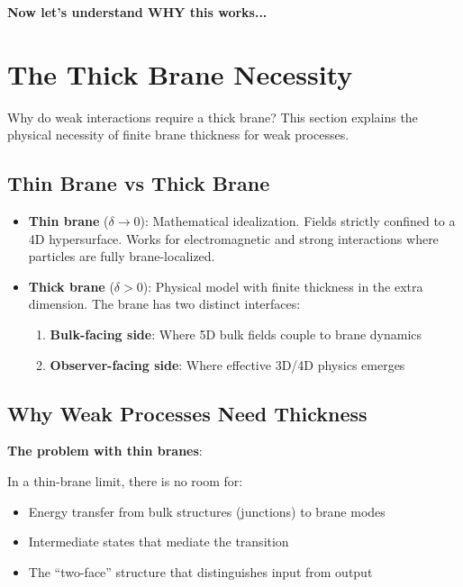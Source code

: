 \textbf{Now let's understand WHY this works...}

\section{The Thick Brane Necessity}
\label{sec:thick_brane}

Why do weak interactions require a thick brane? This section explains the physical
necessity of finite brane thickness for weak processes.

\subsection{Thin Brane vs Thick Brane}

\begin{itemize}[nosep]
\item \textbf{Thin brane} ($\delta \to 0$): Mathematical idealization. Fields strictly
      confined to a 4D hypersurface. Works for electromagnetic and strong interactions
      where particles are fully brane-localized.

\item \textbf{Thick brane} ($\delta > 0$): Physical model with finite thickness
      in the extra dimension. The brane has two distinct interfaces:
      \begin{enumerate}[nosep]
      \item \textbf{Bulk-facing side}: Where 5D bulk fields couple to brane dynamics
      \item \textbf{Observer-facing side}: Where effective 3D/4D physics emerges
      \end{enumerate}
\end{itemize}

\subsection{Why Weak Processes Need Thickness}

\textbf{The problem with thin branes}:

In a thin-brane limit, there is no room for:
\begin{itemize}[nosep]
\item Energy transfer from bulk structures (junctions) to brane modes
\item Intermediate states that mediate the transition
\item The ``two-face'' structure that distinguishes input from output
\end{itemize}

